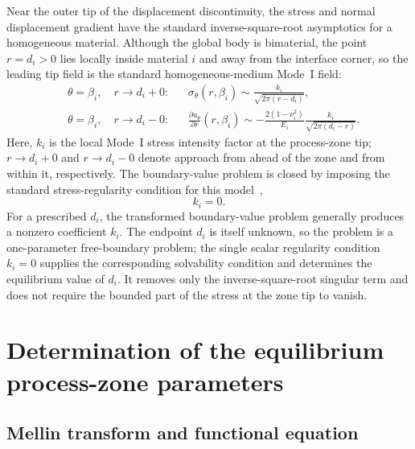 \documentclass[pdflatex,onecolumn,sn-mathphys-ay]{sn-jnl}
\begin{document}
Near the outer tip of the displacement discontinuity, the stress and normal
displacement gradient have the standard inverse-square-root asymptotics for a
homogeneous material. Although the global body is bimaterial, the point
$r=d_i>0$ lies locally inside material $i$ and away from the interface
corner, so the leading tip field is the standard homogeneous-medium
Mode~I field:
\begin{equation}
\label{eq:zone-tip-asymptotics}
\begin{aligned}
  &\theta=\beta_i,\quad r\to d_i+0:
  &&\sigma_\theta(r,\beta_i)
    \sim \frac{k_i}{\sqrt{2\pi(r-d_i)}},\\[3pt]
  &\theta=\beta_i,\quad r\to d_i-0:
  &&\frac{\partial u_\theta}{\partial r}(r,\beta_i)
    \sim -\frac{2(1-\nu_i^2)}{E_i}
    \frac{k_i}{\sqrt{2\pi(d_i-r)}}.
\end{aligned}
\end{equation}
Here, $k_i$ is the local Mode~I stress intensity factor at the process-zone
tip; $r\to d_i+0$ and $r\to d_i-0$ denote approach from ahead of the
zone and from within it, respectively. The boundary-value problem is closed by
imposing the standard stress-regularity condition for this
model~\citep{KaminskyDudykPolishchuk2024},
\begin{equation*}
  k_i=0.
\end{equation*}
For a prescribed $d_i$, the transformed boundary-value problem generally
produces a nonzero coefficient $k_i$. The endpoint $d_i$ is itself unknown,
so the problem is a one-parameter free-boundary problem; the single scalar
regularity condition $k_i=0$ supplies the corresponding solvability
condition and determines the equilibrium value of $d_i$. It removes only
the inverse-square-root singular term and does not require the bounded part
of the stress at the zone tip to vanish.


\section{Determination of the equilibrium process-zone parameters}
\label{sec:derivation}

\subsection{Mellin transform and functional equation}
\label{subsec:mellin}
\end{document}
